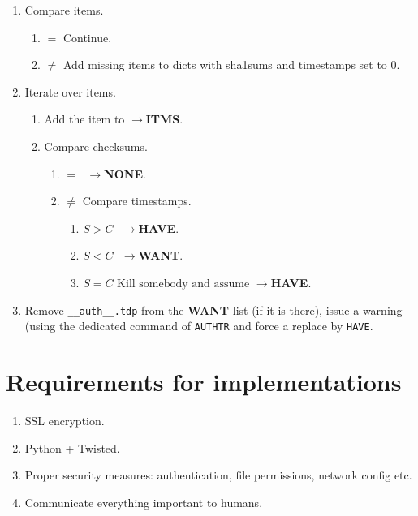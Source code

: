 \documentclass[a4paper,english]{paper}
\providecommand{\\}{\\}
\begin{document}
\begin{enumerate}
    \item Compare items.
        \begin{enumerate}
            \item \(=\) Continue.
            \item \(\neq\) Add missing items to dicts with sha1sums and timestamps set to 0.
        \end{enumerate}
    \item Iterate over items.
        \begin{enumerate}
            \item Add the item to \(\rightarrow\)\textbf{ITMS}.
            \item Compare checksums.
                \begin{enumerate}
                    \item \(=\text{ }\rightarrow\)\textbf{NONE}.
                    \item \(\neq\) Compare timestamps.
                        \begin{enumerate}
                            \item \(S > C\text{ }\rightarrow\)\textbf{HAVE}.
                            \item \(S < C\text{ }\rightarrow\)\textbf{WANT}.
                            \item \(S = C\text{ Kill somebody and assume }\rightarrow\)\textbf{HAVE}.
                        \end{enumerate}
                \end{enumerate}
        \end{enumerate}
    \item Remove \texttt{\_\_auth\_\_.tdp} from the \textbf{WANT} list (if it is there), issue a warning (using the dedicated command of \texttt{AUTHTR} and force a replace by \texttt{HAVE}.
\end{enumerate}

\section{Requirements for implementations}
\begin{enumerate}
    \item SSL encryption.
    \item Python + Twisted.
    \item Proper security measures: authentication, file permissions, network config etc.
    \item Communicate everything important to humans.
\end{enumerate}
\end{document}
